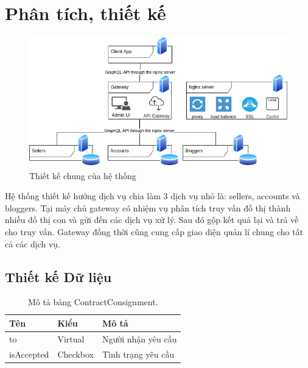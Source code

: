 \documentclass[11pt]{report}
\begin{document}
	\section{Phân tích, thiết kế}\label{section:readme}
	\begin{figure}[h!]
		\begin{center}	
			\includegraphics[width=\textwidth]{srs}
			\caption{Thiết kế chung của hệ thống}
		\end{center}
	\end{figure}
	Hệ thống thiết kế hướng dịch vụ chia làm 3 dịch vụ nhỏ là: sellers, accounts và bloggers. Tại máy chủ gateway có nhiệm vụ phân tích truy vấn đồ thị thành nhiều đồ thị con và gửi đến các dịch vụ xử lý. Sau đó gộp kết quả lại và trả về cho truy vấn. Gateway đồng thời cũng cung cấp giao diện quản lí chung cho tất cả các dịch vụ.
	
	
	
	
	
	\subsection{Thiết kế Dữ liệu}
	\begin{table}[h!]
		\begin{center}
			\caption{Mô tả bảng ContractConsignment.}
			\label{table:ContractConsignment}
			\begin{tabular}{ |l|l|l| } 
				\hline
				Tên & Kiểu & Mô tả \\
				\hline
				to & Virtual & Người nhận yêu cầu \\
				isAccepted & Checkbox & Tình trạng yêu cầu \\
				\hline
			\end{tabular}
		\end{center}
	\end{table}
	
\end{document}
